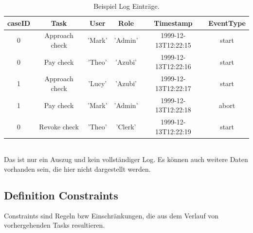 \begin{table}[h]
  \centering
  \begin{tabular}{|c|c|c|c|c|c|}
  \hline
  caseID & Task & User & Role & Timestamp & EventType\\
  \hline
  0 & Approach check &'Mark' &'Admin' &1999-12-13T12:22:15 & start\\
  0 & Pay check & 'Theo' &'Azubi' &1999-12-13T12:22:16 & start\\
  1 & Approach check &'Lucy' & 'Azubi' &1999-12-13T12:22:17 &start\\
  1 & Pay check &'Mark' & 'Admin' &1999-12-13T12:22:18 & abort\\
  0 & Revoke check & 'Theo' & 'Clerk' & 1999-12-13T12:22:19 & start\\
  \hline
  \end{tabular}
\\
Das ist nur ein Auszug und kein vollständiger Log. Es können auch weitere Daten vorhanden sein, die hier nicht dargestellt werden.
  \caption{Beispiel Log Einträge. }
  \label{tab:examplelog}
\end{table}


\subsection{Definition Constraints}
Constraints sind Regeln bzw Einschränkungen, die aus dem Verlauf von vorhergehenden Tasks resultieren.

